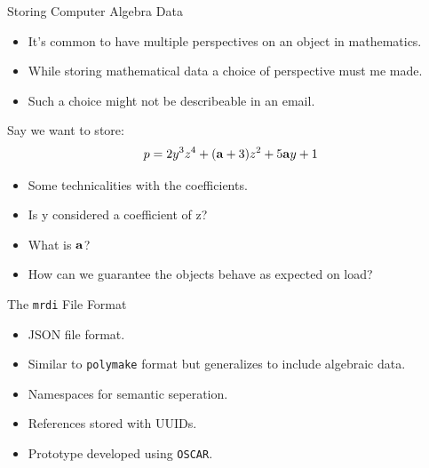 \documentclass[9pt]{beamer}
\newcommand\OSCAR{\texttt{OSCAR}\xspace}
\theoremstyle{definition}
\begin{document}
\begin{frame}[fragile]{Storing Computer Algebra Data}
  \begin{itemize}
  \item It's common to have multiple perspectives on an object in mathematics. 
  \item While storing mathematical data a choice of perspective must me made.
  \item Such a choice might not be describeable in an email.
  \end{itemize}
    
  Say we want to store:
  \begin{align*}
    p = 2y^3z^4 + (\bold{a} + 3)z^2 + 5\bold{a}y + 1
  \end{align*} \pause

  \begin{itemize}
  \item Some technicalities with the coefficients.
  \item Is y considered a coefficient of z?
  \item What is $\bold{a}$?
  \item How can we guarantee the objects behave as expected on load?
  \end{itemize}
\end{frame}


\begin{frame}[fragile]{The \texttt{mrdi} File Format}
  \begin{tcolorbox}[]
    \begin{itemize}
    \item JSON file format.
    \item Similar to \texttt{polymake} format but generalizes to include algebraic data.
    \item Namespaces for semantic seperation.
    \item References stored with UUIDs.
    \item Prototype developed using \OSCAR.
    \end{itemize}
  \end{tcolorbox}
\end{frame}
\end{document}
